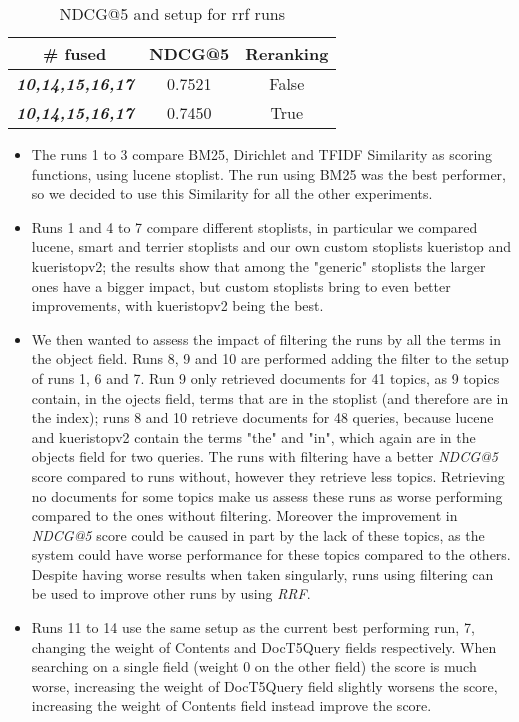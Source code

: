 \begin{table}[t]
	\caption{NDCG@5 and setup for rrf runs}
	\label{tab:results-rrf-table}
	\centering
	\begin{tabular}{|c|c|c|}
		\toprule
		\# fused & NDCG@5 & Reranking \\
		\midrule
		\textit{\textbf{10,14,15,16,17}} & 0.7521 & False \\
		\textit{\textbf{10,14,15,16,17}} & 0.7450 & True \\
		\bottomrule
	\end{tabular}
\end{table}

\begin{itemize}
\item The runs 1 to 3 compare BM25, Dirichlet and TFIDF Similarity as scoring functions, using lucene stoplist.
The run using BM25 was the best performer, so we decided to use this Similarity for all the other experiments.

\item Runs 1 and 4 to 7 compare different stoplists, in particular we compared lucene, smart and terrier stoplists and our own custom stoplists kueristop and kueristopv2; the results show that among the "generic" stoplists the larger ones have a bigger impact, but custom stoplists bring to even better improvements, with kueristopv2 being the best.

\item We then wanted to assess the impact of filtering the runs by all the terms in the object field.
Runs 8, 9 and 10 are performed adding the filter to the setup of runs 1, 6 and 7.
Run 9 only retrieved documents for 41 topics, as 9 topics contain, in the ojects field, terms that are in the stoplist (and therefore are in the index); runs 8 and 10 retrieve documents for 48 queries, because lucene and kueristopv2 contain the terms "the" and "in", which again are in the objects field for two queries.
The runs with filtering have a better \textit{NDCG@5} score compared to runs without, however they retrieve less topics. Retrieving no documents for some topics make us assess these runs as worse performing compared to the ones without filtering. Moreover the improvement in \textit{NDCG@5} score could be caused in part by the lack of these topics, as the system could have worse performance for these topics compared to the others.
Despite having worse results when taken singularly, runs using filtering can be used to improve other runs by using \textit{RRF}.

\item Runs 11 to 14 use the same setup as the current best performing run, 7, changing the weight of Contents and DocT5Query fields respectively.
When searching on a single field (weight 0 on the other field) the score is much worse, increasing the weight of DocT5Query field slightly worsens the score, increasing the weight of Contents field instead improve the score.


\end{itemize}
